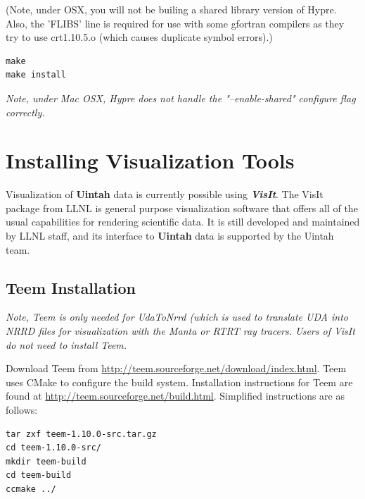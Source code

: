 \documentclass[12pt]{article}
\begin{document}
(Note, under OSX, you will not be builing a shared library version of
Hypre.  Also, the 'FLIBS' line is required for use with some 
gfortran compilers as they try to use crt1.10.5.o (which causes
duplicate symbol errors).)

\begin{verbatim}
make
make install
\end{verbatim}

\emph{Note, under Mac OSX, Hypre does not handle the "--enable-shared" configure
  flag correctly.}

\section{Installing Visualization Tools}

Visualization of \textbf{Uintah} data is currently possible using
\textbf{\emph{VisIt}}. The VisIt package from LLNL is general purpose
visualization software that offers all of the usual capabilities for
rendering scientific data.  It is still developed and maintained by
LLNL staff, and its interface to \textbf{Uintah} data is supported by
the Uintah team.


\subsection{Teem Installation}
\label{subsec:teem}

\emph{Note, Teem is only needed for UdaToNrrd (which is used to
  translate UDA into NRRD files for visualization with the Manta or
  RTRT ray tracers.  Users of VisIt do not need to install Teem.}

Download Teem from
\url{http://teem.sourceforge.net/download/index.html}.  Teem uses
CMake to configure the build system. Installation instructions for
Teem are found at \url{http://teem.sourceforge.net/build.html}.  Simplified
instructions are as follows:

\begin{verbatim}
tar zxf teem-1.10.0-src.tar.gz
cd teem-1.10.0-src/
mkdir teem-build
cd teem-build
ccmake ../
\end{verbatim}
\end{document}
